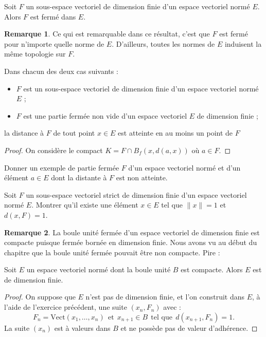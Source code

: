 \documentclass[french]{article}
\newcommand{\Vect}{\text{Vect}}
\theoremstyle{plain}
\theoremstyle{definition}
\newtheorem*{rmq}{Remarque}
\theoremstyle{remark}
\begin{document}
\begin{prop}%
	Soit $F$ un sous-espace vectoriel de dimension finie d'un espace vectoriel normé $E$. Alors $F$ est fermé dans $E$.
\end{prop}

\begin{rmq}
	Ce qui est remarquable dans ce résultat, c'est que $F$ est fermé pour n'importe quelle norme de $E$. D'ailleurs, toutes les normes de $E$ induisent la même topologie sur $F$.
\end{rmq}

\begin{prop}[HP]%
	Dans chacun des deux cas suivants :
	\begin{itemize}
		\item $F$ est un sous-espace vectoriel de dimension finie d'un espace vectoriel normé $E$ ;
		\item $F$ est une partie fermée non vide d'un espace vectoriel $E$ de dimension finie ;
	\end{itemize}
	la distance à $F$ de tout point $x\in E$ est atteinte en au moins un point de $F$
\end{prop}
\begin{proof}
	On considère le compact $K=F\cap B_f(x,d(a,x))$ où $a\in F$.
\end{proof}

\begin{exo}
	Donner un exemple de partie fermée $F$ d'un espace vectoriel normé et d'un élément $a\in E$ dont la distante à $F$ est non atteinte.
\end{exo}

\begin{exo}
	Soit $F$ un sous-espace vectoriel strict de dimension finie d'un espace vectoriel normé $E$. Montrer qu'il existe une élément $x\in E$ tel que $\lVert x\rVert=1$ et $d(x,F)=1$.
\end{exo}

\begin{rmq}
	La boule unité fermée d'un espace vectoriel de dimension finie est compacte puisque fermée bornée en dimension finie. Nous avons vu au début du chapitre que la boule unité fermée pouvait être non compacte. Pire :
\end{rmq}

\begin{thm}%
	Soit $E$ un espace vectoriel normé dont la boule unité $B$ est compacte. Alors $E$ est de dimension finie.
\end{thm}
\begin{proof}
	On suppose que $E$ n'est pas de dimension finie, et l'on construit dans $E$, à l'aide de l'exercice précédent, une suite $(x_n,F_n)$ avec : $$F_n=\Vect(x_1,\ldots,x_n)\ \ \text{et}\ \ x_{n+1}\in B\ \ \text{tel que}\ \ d(x_{n+1},F_n)=1.$$ La suite $(x_n)$ est à valeurs dans $B$ et ne possède pas de valeur d'adhérence.
\end{proof}
\end{document}
